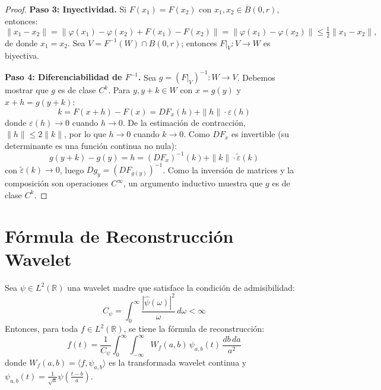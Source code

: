 \begin{proof}
\textbf{Paso 3: Inyectividad.}
Si $F(x_1) = F(x_2)$ con $x_1, x_2 \in \overline{B}(0, r)$, entonces:
\[
\|x_1 - x_2\| = \|\varphi(x_1) - \varphi(x_2) + F(x_1) - F(x_2)\| = \|\varphi(x_1) - \varphi(x_2)\| \leq \tfrac{1}{2}\|x_1 - x_2\|,
\]
de donde $x_1 = x_2$. Sea $V = F^{-1}(W) \cap B(0, r)$; entonces $F|_V: V \to W$ es biyectiva.

\textbf{Paso 4: Diferenciabilidad de $F^{-1}$.}
Sea $g = (F|_V)^{-1}: W \to V$. Debemos mostrar que $g$ es de clase $C^k$. Para $y, y + k \in W$ con $x = g(y)$ y $x + h = g(y + k)$:
\[
k = F(x + h) - F(x) = DF_x(h) + \|h\| \cdot \varepsilon(h)
\]
donde $\varepsilon(h) \to 0$ cuando $h \to 0$. De la estimación de contracción, $\|h\| \leq 2\|k\|$, por lo que $h \to 0$ cuando $k \to 0$. Como $DF_x$ es invertible (su determinante es una función continua no nula):
\[
g(y + k) - g(y) = h = (DF_x)^{-1}(k) + \|k\| \cdot \tilde{\varepsilon}(k)
\]
con $\tilde{\varepsilon}(k) \to 0$, luego $Dg_y = (DF_{g(y)})^{-1}$. Como la inversión de matrices y la composición son operaciones $C^\infty$, un argumento inductivo muestra que $g$ es de clase $C^k$.
\end{proof}


\section{Fórmula de Reconstrucción Wavelet}\label{sec:reconstruccion_wavelet}

\begin{theorem}\label{thm:reconstruccion_wavelet_apendice}
Sea $\psi \in L^2(\mathbb{R})$ una wavelet madre que satisface la condición de admisibilidad:
\[
C_\psi = \int_0^\infty \frac{|\hat{\psi}(\omega)|^2}{\omega} \, d\omega < \infty
\]
Entonces, para toda $f \in L^2(\mathbb{R})$, se tiene la fórmula de reconstrucción:
\[
f(t) = \frac{1}{C_\psi} \int_0^\infty \int_{-\infty}^{\infty} W_f(a, b) \, \psi_{a,b}(t) \, \frac{db \, da}{a^2}
\]
donde $W_f(a, b) = \langle f, \psi_{a,b} \rangle$ es la transformada wavelet continua y $\psi_{a,b}(t) = \frac{1}{\sqrt{a}} \psi\left(\frac{t-b}{a}\right)$.
\end{theorem}

